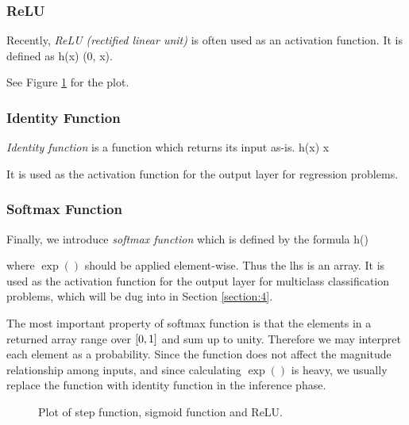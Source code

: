 \documentclass{article}
\theoremstyle{definition}
\newcommand{\sect}[1]{Section \ref{section:#1}}
\newcommand{\fig}[1]{Figure \ref{fig:#1}}
\begin{document}
\subsubsection{ReLU} \label{section:3.2.3}

Recently, {\it ReLU (rectified linear unit)} is often used as an activation function. It is defined as
\begineq
h(x) \equiv {} (0, x). 
\edeq

See \fig{3.2} for the plot.

\subsubsection{Identity Function}

{\it Identity function} is a function which returns its input as-is.
\begineq
h(x) \equiv x 
\edeq

It is used as the activation function for the output layer for regression problems.

\subsubsection{Softmax Function} \label{section:3.2.5}

Finally, we introduce {\it softmax function} which is defined by the formula
\begineq
h() \equiv {} 
\edeq

where $\exp()$ should be applied element-wise. Thus the lhs is an array. It is used as the activation function for the output layer for multiclass classification problems, which will be dug into in \sect{4}.

\newpage

The most important property of softmax function is that the elements in a returned array range over $\left[ 0, 1 \right]$ and sum up to unity. Therefore we may interpret each element as a probability. Since the function does not affect the magnitude relationship among inputs, and since calculating $\exp()$ is heavy, we usually replace the function with identity function in the inference phase.

\enter
\begin{figure}[H]
    \centering
    \begin{subfigure}[H]{1.0\textwidth}
	\end{subfigure}
    \caption{Plot of step function, sigmoid function and ReLU.}
    \label{fig:3.2}
\end{figure}
\end{document}
